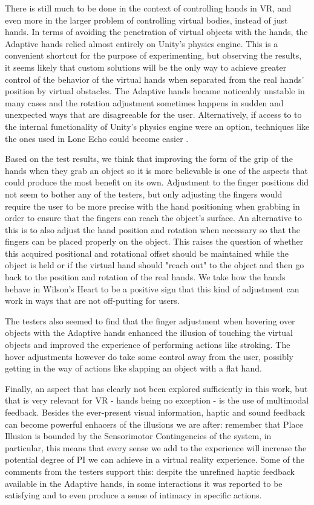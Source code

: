 There is still much to be done in the context of controlling hands in VR, and even more in the larger problem of controlling virtual bodies, instead of just hands. In terms of avoiding the penetration of virtual objects with the hands, the Adaptive hands relied almost entirely on Unity's physics engine. This is a convenient shortcut for the purpose of experimenting, but observing the results, it seems likely that custom solutions will be the only way to achieve greater control of the behavior of the virtual hands when separated from the real hands' position by virtual obstacles. The Adaptive hands became noticeably unstable in many cases and the rotation adjustment sometimes happens in sudden and unexpected ways that are disagreeable for the user. Alternatively, if access to to the internal functionality of Unity's physics engine were an option, techniques like the ones used in Lone Echo could become easier \parencite{loneEchoVideo}.

Based on the test results, we think that improving the form of the grip of the hands when they grab an object so it is more believable is one of the aspects that could produce the most benefit on its own. Adjustment to the finger positions did not seem to bother any of the testers, but only adjusting the fingers would require the user to be more precise with the hand positioning when grabbing in order to ensure that the fingers can reach the object's surface. An alternative to this is to also adjust the hand position and rotation when necessary so that the fingers can be placed properly on the object. This raises the question of whether this acquired positional and rotational offset should be maintained while the object is held or if the virtual hand should "reach out" to the object and then go back to the position and rotation of the real hands. We take how the hands behave in Wilson's Heart to be a positive sign that this kind of adjustment can work in ways that are not off-putting for users.

The testers also seemed to find that the finger adjustment when hovering over objects with the Adaptive hands enhanced the illusion of touching the virtual objects and improved the experience of performing actions like stroking. The hover adjustments however do take some control away from the user, possibly getting in the way of actions like slapping an object with a flat hand.

Finally, an aspect that has clearly not been explored sufficiently in this work, but that is very relevant for VR - hands being no exception - is the use of multimodal feedback. Besides the ever-present visual information, haptic and sound feedback can become powerful enhacers of the illusions we are after: remember that Place Illusion is bounded by the Sensorimotor Contingencies of the system, in particular, this means that every sense we add to the experience will increase the potential degree of PI we can achieve in a virtual reality experience. Some of the comments from the testers support this: despite the unrefined haptic feedback available in the Adaptive hands, in some interactions it was reported to be satisfying and to even produce a sense of intimacy in specific actions.